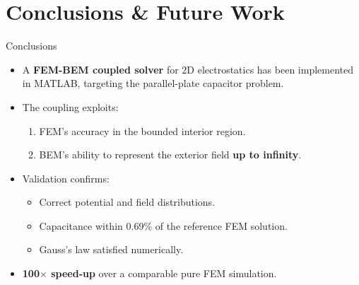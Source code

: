 \documentclass[aspectratio=169]{beamer}
\begin{document}

\section{Conclusions \& Future Work}

\begin{frame}{Conclusions}

  \begin{itemize}
    \item A \textbf{FEM-BEM coupled solver} for 2D electrostatics has been implemented
          in MATLAB, targeting the parallel-plate capacitor problem.

    \item The coupling exploits:
      \begin{enumerate}
        \item FEM's accuracy in the bounded interior region.
        \item BEM's ability to represent the exterior field \textbf{up to infinity}.
      \end{enumerate}

    \item Validation confirms:
      \begin{itemize}
        \item Correct potential and field distributions.
        \item Capacitance within 0.69\% of the reference FEM solution.
        \item Gauss's law satisfied numerically.
      \end{itemize}

    \item \textbf{100$\times$ speed-up} over a comparable pure FEM simulation.
  \end{itemize}

\end{frame}
\end{document}
